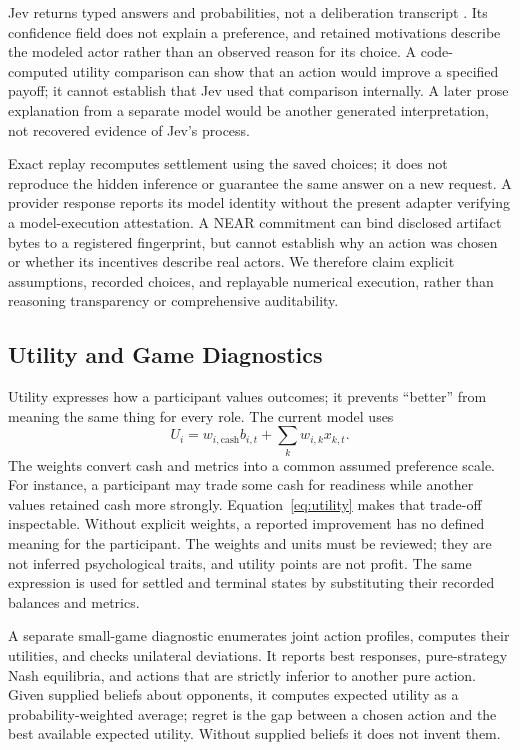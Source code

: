 Jev returns typed answers and probabilities, not a deliberation transcript
\cite{typesafeapi}. Its confidence field does not explain a preference, and
retained motivations describe the modeled actor rather than an observed reason
for its choice. A code-computed utility comparison can show that an action
would improve a specified payoff; it cannot establish that Jev used that
comparison internally. A later prose explanation from a separate model would
be another generated interpretation, not recovered evidence of Jev's process.

Exact replay recomputes settlement using the saved choices; it does not
reproduce the hidden inference or guarantee the same answer on a new request.
A provider response reports its model identity without the present adapter
verifying a model-execution attestation. A NEAR commitment can bind disclosed
artifact bytes to a registered fingerprint, but cannot establish why an action
was chosen or whether its incentives describe real actors. We therefore claim
explicit assumptions, recorded choices, and replayable numerical execution,
rather than reasoning transparency or comprehensive auditability.

\subsection{Utility and Game Diagnostics}
Utility expresses how a participant values outcomes; it prevents ``better''
from meaning the same thing for every role. The current model uses
\begin{equation}
U_i=w_{i,\mathrm{cash}}b_{i,t}+\sum_k w_{i,k}x_{k,t}.
\label{eq:utility}
\end{equation}
The weights convert cash and metrics into a common assumed preference scale.
For instance, a participant may trade some cash for readiness while another
values retained cash more strongly. Equation~\eqref{eq:utility} makes that
trade-off inspectable. Without explicit weights, a reported improvement has
no defined meaning for the participant. The weights and units must be reviewed;
they are not inferred psychological traits, and utility points are not profit.
The same expression is used for settled and terminal states by substituting
their recorded balances and metrics.

A separate small-game diagnostic enumerates joint action profiles, computes
their utilities, and checks unilateral deviations. It reports best responses,
pure-strategy Nash equilibria, and actions that are strictly inferior to another
pure action. Given supplied beliefs about opponents, it computes expected
utility as a probability-weighted average; regret is the gap between a chosen
action and the best available expected utility. Without supplied beliefs it
does not invent them.

